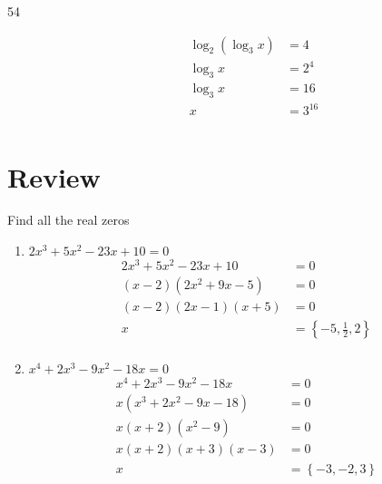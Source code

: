 \documentclass{exam}
\begin{document}
\begin{description}
        \item[54] 
          \begin{align*}
            \log_2 (\log_3 x) &= 4 \\
            \log_3 x          &= 2^4 \\
            \log_3 x          &= 16 \\
            x                 &= \boxed{3^{16}} \\
          \end{align*}

      \end{description}
    \fi

    \section{Review}

    Find all the real zeros
    \begin{enumerate}
      \item $2x^3 + 5x^2 - 23x + 10 = 0$
        \ifprintanswers
          \begin{align*}
            2x^3 + 5x^2 - 23x + 10                &= 0 \\
            (x - 2)\left( 2 x^2 + 9 x - 5 \right) &= 0 \\
            (x - 2)(2x - 1)(x + 5)                &= 0 \\
            x                                     &= \boxed{ \left\{ - 5, \frac{1}{2}, 2 \right\} } \\
          \end{align*}
        \fi

      \item $x^4 + 2x^3 - 9x^2 - 18x = 0$
        \ifprintanswers
          \begin{align*}
            x^4 + 2x^3 - 9x^2 - 18x               &= 0 \\
            x \left( x^3 + 2x^2 - 9x - 18 \right) &= 0 \\
            x (x + 2) \left( x^2 - 9 \right)      &= 0 \\
            x (x + 2) (x + 3)(x - 3)              &= 0 \\
            x                                     &= \boxed{ \left\{ -3, -2, 3 \right\} } \\
          \end{align*}
        \fi

    \end{enumerate}
\end{document}
